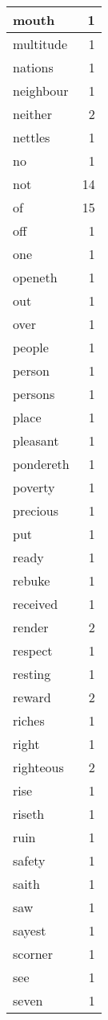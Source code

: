 \begin{center}
\begin{longtable}{l|r}
mouth & 1\\ \hline 
multitude & 1\\ \hline 
nations & 1\\ \hline 
neighbour & 1\\ \hline 
neither & 2\\ \hline 
nettles & 1\\ \hline 
no & 1\\ \hline 
not & 14\\ \hline 
of & 15\\ \hline 
off & 1\\ \hline 
one & 1\\ \hline 
openeth & 1\\ \hline 
out & 1\\ \hline 
over & 1\\ \hline 
people & 1\\ \hline 
person & 1\\ \hline 
persons & 1\\ \hline 
place & 1\\ \hline 
pleasant & 1\\ \hline 
pondereth & 1\\ \hline 
poverty & 1\\ \hline 
precious & 1\\ \hline 
put & 1\\ \hline 
ready & 1\\ \hline 
rebuke & 1\\ \hline 
received & 1\\ \hline 
render & 2\\ \hline 
respect & 1\\ \hline 
resting & 1\\ \hline 
reward & 2\\ \hline 
riches & 1\\ \hline 
right & 1\\ \hline 
righteous & 2\\ \hline 
rise & 1\\ \hline 
riseth & 1\\ \hline 
ruin & 1\\ \hline 
safety & 1\\ \hline 
saith & 1\\ \hline 
saw & 1\\ \hline 
sayest & 1\\ \hline 
scorner & 1\\ \hline 
see & 1\\ \hline 
seven & 1\\ \hline 

\end{longtable}
\end{center}
